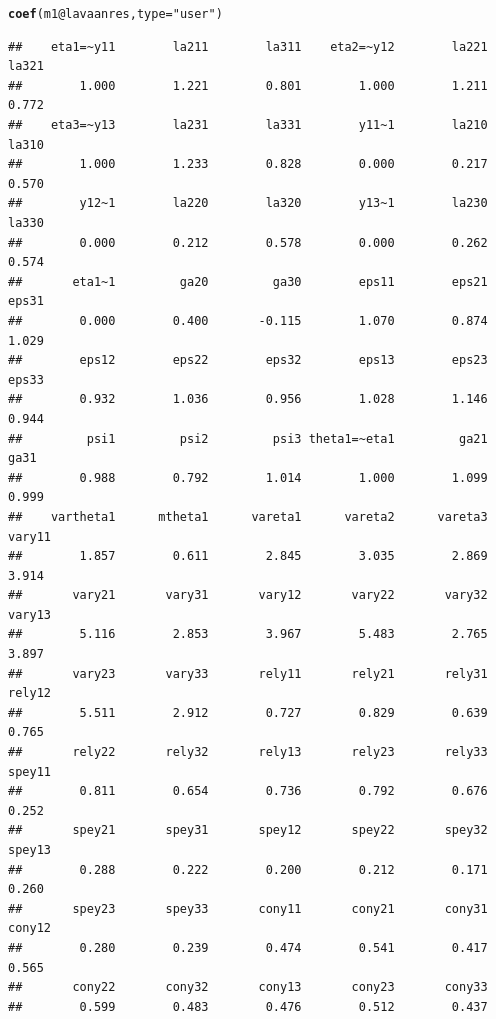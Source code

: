 \documentclass[10pt]{article}\usepackage[]{graphicx}\usepackage[]{xcolor}
\makeatletter
\newcommand{\hlstr}[1]{\textcolor[rgb]{0.192,0.494,0.8}{#1}}%
\newcommand{\hlopt}[1]{\textcolor[rgb]{0,0,0}{#1}}%
\newcommand{\hlstd}[1]{\textcolor[rgb]{0.345,0.345,0.345}{#1}}%
\newcommand{\hlkwc}[1]{\textcolor[rgb]{0.333,0.667,0.333}{#1}}%
\newcommand{\hlkwd}[1]{\textcolor[rgb]{0.737,0.353,0.396}{\textbf{#1}}}%
\newenvironment{kframe}{%
 \def\at@end@of@kframe{}%
 \ifinner\ifhmode%
  \def\at@end@of@kframe{\end{minipage}}%
  \begin{minipage}{\columnwidth}%
 \fi\fi%
 \def\FrameCommand##1{\hskip\@totalleftmargin \hskip-\fboxsep
 \colorbox{shadecolor}{##1}\hskip-\fboxsep
     \hskip-\linewidth \hskip-\@totalleftmargin \hskip\columnwidth}%
 \MakeFramed {\advance\hsize-\width
   \@totalleftmargin\z@ \linewidth\hsize
   \@setminipage}}%
 {\par\unskip\endMakeFramed%
 \at@end@of@kframe}
\newenvironment{knitrout}{}{} %
\makeatother
\begin{document}
\begin{knitrout}
\color{fgcolor}\begin{kframe}
\begin{alltt}
\hlkwd{coef}\hlstd{(m1}\hlopt{@}\hlkwc{lavaanres}\hlstd{,} \hlkwc{type}\hlstd{=}\hlstr{"user"}\hlstd{)}
\end{alltt}
\begin{verbatim}
##    eta1=~y11        la211        la311    eta2=~y12        la221        la321 
##        1.000        1.221        0.801        1.000        1.211        0.772 
##    eta3=~y13        la231        la331        y11~1        la210        la310 
##        1.000        1.233        0.828        0.000        0.217        0.570 
##        y12~1        la220        la320        y13~1        la230        la330 
##        0.000        0.212        0.578        0.000        0.262        0.574 
##       eta1~1         ga20         ga30        eps11        eps21        eps31 
##        0.000        0.400       -0.115        1.070        0.874        1.029 
##        eps12        eps22        eps32        eps13        eps23        eps33 
##        0.932        1.036        0.956        1.028        1.146        0.944 
##         psi1         psi2         psi3 theta1=~eta1         ga21         ga31 
##        0.988        0.792        1.014        1.000        1.099        0.999 
##    vartheta1      mtheta1      vareta1      vareta2      vareta3       vary11 
##        1.857        0.611        2.845        3.035        2.869        3.914 
##       vary21       vary31       vary12       vary22       vary32       vary13 
##        5.116        2.853        3.967        5.483        2.765        3.897 
##       vary23       vary33       rely11       rely21       rely31       rely12 
##        5.511        2.912        0.727        0.829        0.639        0.765 
##       rely22       rely32       rely13       rely23       rely33       spey11 
##        0.811        0.654        0.736        0.792        0.676        0.252 
##       spey21       spey31       spey12       spey22       spey32       spey13 
##        0.288        0.222        0.200        0.212        0.171        0.260 
##       spey23       spey33       cony11       cony21       cony31       cony12 
##        0.280        0.239        0.474        0.541        0.417        0.565 
##       cony22       cony32       cony13       cony23       cony33 
##        0.599        0.483        0.476        0.512        0.437
\end{verbatim}
\end{kframe}
\end{knitrout}
%
\end{document}
